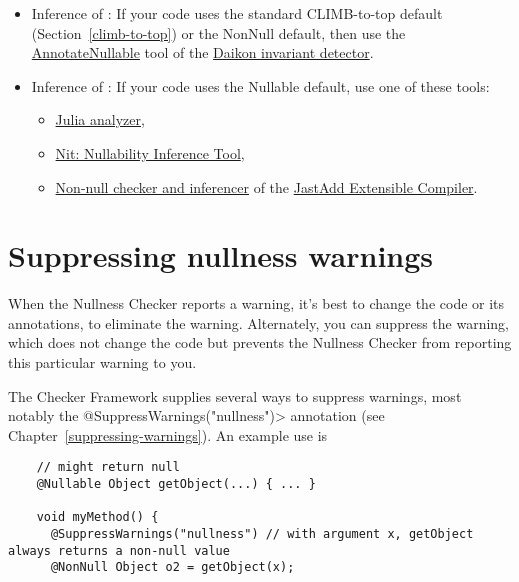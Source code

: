 \begin{itemize}

\item
  Inference of :
  If your code uses the standard CLIMB-to-top default (Section~\ref{climb-to-top}) or
  the NonNull default, then use the
  \href{http://plse.cs.washington.edu/daikon/download/doc/daikon.html#AnnotateNullable}{AnnotateNullable}
  tool of the \href{http://plse.cs.washington.edu/daikon/}{Daikon invariant
    detector}.

\item
  Inference of :
  If your code uses the Nullable default, use one of these tools:
\begin{itemize}
\item
  \href{https://www.juliasoft.com/eng}{Julia analyzer},
\item
  \href{http://nit.gforge.inria.fr}{Nit: Nullability Inference Tool},
\item
  \href{http://jastadd.org/jastadd-tutorial-examples/non-null-types-for-java/}{Non-null
    checker and inferencer} of the \href{http://jastadd.org/}{JastAdd
    Extensible Compiler}.
\end{itemize}

\end{itemize}



\section{Suppressing nullness warnings\label{suppressing-warnings-nullness}}

When the Nullness Checker reports a warning, it's best to change the code
or its annotations, to eliminate the warning.  Alternately, you can
suppress the warning, which does not change the code but prevents the
Nullness Checker from reporting this particular warning to you.

\begin{sloppypar}
The Checker Framework supplies several ways to suppress warnings, most
notably the \<@SuppressWarnings("nullness")> annotation (see
Chapter~\ref{suppressing-warnings}).  An example use is
\end{sloppypar}

\begin{smaller}
\begin{Verbatim}
    // might return null
    @Nullable Object getObject(...) { ... }

    void myMethod() {
      @SuppressWarnings("nullness") // with argument x, getObject always returns a non-null value
      @NonNull Object o2 = getObject(x);
\end{Verbatim}
\end{smaller}


